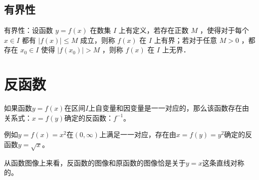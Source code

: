 \subsection{有界性}

\begin{definition}[有界性]
    有界性：设函数 $y=f(x)$ 在数集 $I$ 上有定义，若存在正数 $M$ ，使得对于每个 $x \in I$ 都有 $|f(x)| \leq M$ 成立，则称 $f(x)$ 在 $I$ 上有界；若对于任意 $M>0$ ，都存在 $x_0 \in I$ 使得 $\left|f\left(x_0\right)\right|>M$ ，则称 $f(x)$ 在 $I$ 上无界．
\end{definition}


\section{反函数}

\begin{definition}[反函数]
    如果函数$y=f(x)$在区间$I$上自变量和因变量是一一对应的，那么该函数存在由关系式：$x=f(y)$确定的反函数：$f^{-1}$。

    例如$y=f(x)=x^2$在$(0,\infty)$上满足一一对应，存在由$x=f(y)=y^2$确定的反函数$y=\sqrt{x}$。
\end{definition}

从函数图像上来看，反函数的图像和原函数的图像恰是关于$y=x$这条直线对称的。
